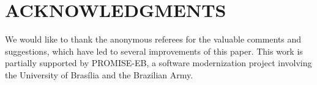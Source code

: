 \section{ACKNOWLEDGMENTS}

We would like to thank the anonymous referees for the
valuable comments and suggestions, which have led to
several improvements of this paper. This work is partially
supported by \textsc{PROMISE-EB}, a software modernization
project involving the University of Bras\'{i}lia and
the Brazilian Army.